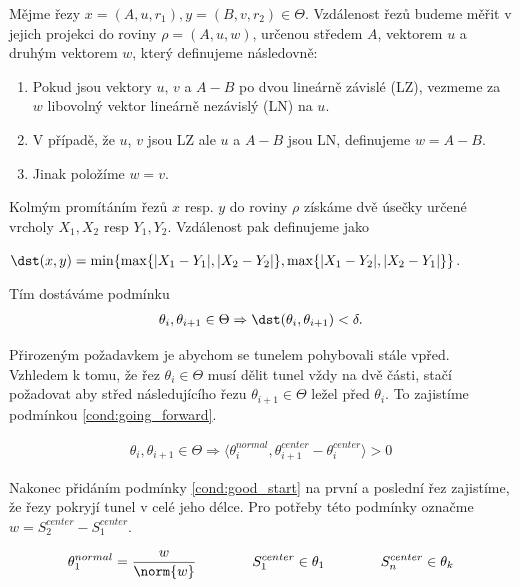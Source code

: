 \begin{defi}
Mějme řezy $ x = (A, u, r_1), y = (B, v, r_2) \in \Theta $. Vzdálenost řezů budeme
měřit v jejich projekci do roviny $ \rho = (A, u, w) $, určenou středem $ A $,
vektorem $ u $ a druhým vektorem $ w $, který definujeme následovně:
    \begin{enumerate}[label={(\arabic*)}]
        \item Pokud jsou vektory $ u $, $ v $ a $ A - B $ po dvou lineárně závislé (LZ), vezmeme
            za $ w $ libovolný vektor lineárně nezávislý (LN) na $ u $.
        \item V případě, že $ u $, $ v $ jsou LZ ale $ u $ a $ A - B $ jsou LN,
            definujeme $ w = A - B $.
        \item Jinak položíme $ w = v $.
    \end{enumerate}
Kolmým promítáním řezů $ x $ resp. $ y $ do roviny  $ \rho $ získáme dvě úsečky
určené vrcholy $X_1, X_2 $ resp $Y_1, Y_2 $. Vzdálenost pak definujeme jako
\begin{center}
    $ \dst(x, y) = \min\{ \max\{|X_1 - Y_1|, |X_2 - Y_2|\}, \max\{|X_1 - Y_2|, |X_2 - Y_1|\}\}$.
\end{center}
\end{defi}

Tím dostáváme podmínku
\begin{align}
    \theta_i, \theta_{i+1} \in \Theta \Rightarrow \dst(\theta_i, \theta_{i+1}) < \delta.
    \label{cond:distance}
\end{align}


Přirozeným požadavkem je abychom se tunelem pohybovali stále vpřed.
Vzhledem k tomu, že řez $ \theta_i \in \Theta $ musí dělit tunel vždy na dvě části, stačí
požadovat aby střed následujícího řezu $ \theta_{i + 1} \in \Theta $ ležel před
$ \theta_i $. To zajistíme podmínkou \ref{cond:going_forward}.

\begin{align}
    \theta_i, \theta_{i+1} \in \Theta
        \Rightarrow \langle \theta_i^{normal}, \theta_{i+1}^{center} - \theta_i^{center} \rangle > 0
        \label{cond:going_forward}
\end{align}

Nakonec přidáním podmínky \ref{cond:good_start} na první a poslední řez zajistíme,
že řezy pokryjí tunel v celé jeho délce. Pro potřeby této podmínky označme
$ w = S_2^{center} - S_1^{center} $.

\begin{align}
    \theta_1^{normal} = \frac{w}{\norm{w}}
    \qquad  \qquad S_1^{center} \in \theta_1
    \qquad  \qquad S_n^{center} \in \theta_k
    \label{cond:good_start}
\end{align}

